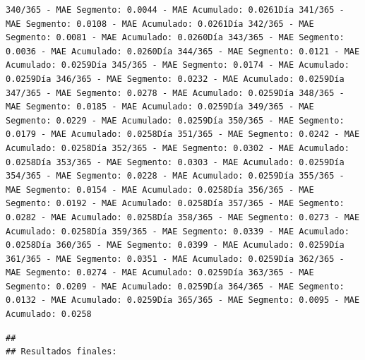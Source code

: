 \documentclass[
]{book}
\begin{document}
\begin{verbatim}
340/365 - MAE Segmento: 0.0044 - MAE Acumulado: 0.0261Día 341/365 - MAE Segmento: 0.0108 - MAE Acumulado: 0.0261Día 342/365 - MAE Segmento: 0.0081 - MAE Acumulado: 0.0260Día 343/365 - MAE Segmento: 0.0036 - MAE Acumulado: 0.0260Día 344/365 - MAE Segmento: 0.0121 - MAE Acumulado: 0.0259Día 345/365 - MAE Segmento: 0.0174 - MAE Acumulado: 0.0259Día 346/365 - MAE Segmento: 0.0232 - MAE Acumulado: 0.0259Día 347/365 - MAE Segmento: 0.0278 - MAE Acumulado: 0.0259Día 348/365 - MAE Segmento: 0.0185 - MAE Acumulado: 0.0259Día 349/365 - MAE Segmento: 0.0229 - MAE Acumulado: 0.0259Día 350/365 - MAE Segmento: 0.0179 - MAE Acumulado: 0.0258Día 351/365 - MAE Segmento: 0.0242 - MAE Acumulado: 0.0258Día 352/365 - MAE Segmento: 0.0302 - MAE Acumulado: 0.0258Día 353/365 - MAE Segmento: 0.0303 - MAE Acumulado: 0.0259Día 354/365 - MAE Segmento: 0.0228 - MAE Acumulado: 0.0259Día 355/365 - MAE Segmento: 0.0154 - MAE Acumulado: 0.0258Día 356/365 - MAE Segmento: 0.0192 - MAE Acumulado: 0.0258Día 357/365 - MAE Segmento: 0.0282 - MAE Acumulado: 0.0258Día 358/365 - MAE Segmento: 0.0273 - MAE Acumulado: 0.0258Día 359/365 - MAE Segmento: 0.0339 - MAE Acumulado: 0.0258Día 360/365 - MAE Segmento: 0.0399 - MAE Acumulado: 0.0259Día 361/365 - MAE Segmento: 0.0351 - MAE Acumulado: 0.0259Día 362/365 - MAE Segmento: 0.0274 - MAE Acumulado: 0.0259Día 363/365 - MAE Segmento: 0.0209 - MAE Acumulado: 0.0259Día 364/365 - MAE Segmento: 0.0132 - MAE Acumulado: 0.0259Día 365/365 - MAE Segmento: 0.0095 - MAE Acumulado: 0.0258
\end{verbatim}

\begin{verbatim}
## 
## Resultados finales:
\end{verbatim}
\end{document}
